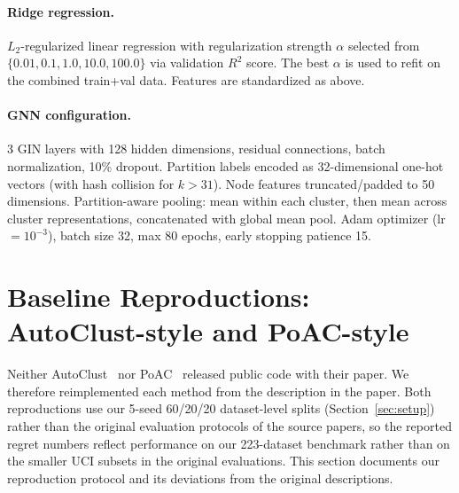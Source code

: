 \documentclass[10pt]{article} %
\begin{document}
\paragraph{Ridge regression.}
$L_2$-regularized linear regression with regularization strength $\alpha$ selected from $\{0.01, 0.1, 1.0, 10.0, 100.0\}$ via validation $R^2$ score. The best $\alpha$ is used to refit on the combined train+val data. Features are standardized as above.

\paragraph{GNN configuration.}
3 GIN layers with 128 hidden dimensions, residual connections, batch normalization, 10\% dropout. Partition labels encoded as 32-dimensional one-hot vectors (with hash collision for $k > 31$). Node features truncated/padded to 50 dimensions. Partition-aware pooling: mean within each cluster, then mean across cluster representations, concatenated with global mean pool. Adam optimizer (lr $= 10^{-3}$), batch size 32, max 80 epochs, early stopping patience 15.


\section{Baseline Reproductions: AutoClust-style and PoAC-style}
\label{app:baseline_reproductions}

Neither AutoClust~\citep{poulakis2020autoclust} nor PoAC~\citep{dasilva2024poac} released public code with their paper. We therefore reimplemented each method from the description in the paper. Both reproductions use our 5-seed 60/20/20 dataset-level splits (Section~\ref{sec:setup}) rather than the original evaluation protocols of the source papers, so the reported regret numbers reflect performance on our 223-dataset benchmark rather than on the smaller UCI subsets in the original evaluations. This section documents our reproduction protocol and its deviations from the original descriptions.
\end{document}
